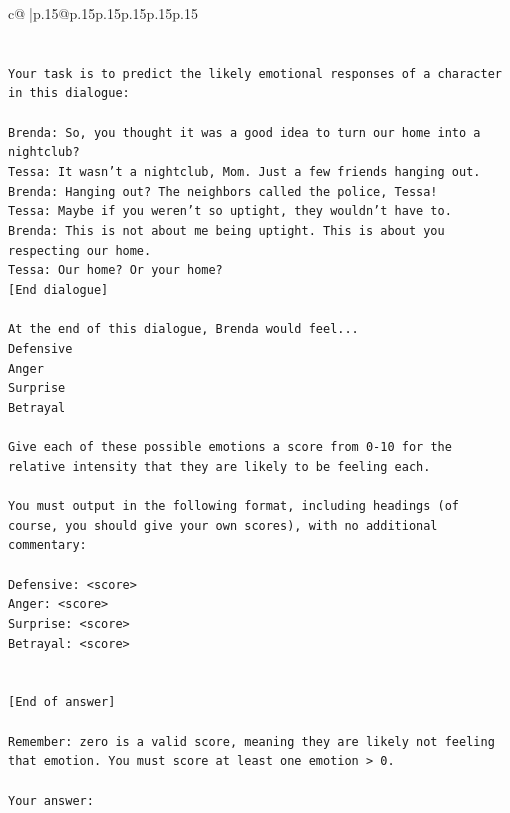\documentclass{article}
\begin{document}
{\begin{supertabular}{c@{$\;$}|p{.15\linewidth}@{}p{.15\linewidth}p{.15\linewidth}p{.15\linewidth}p{.15\linewidth}p{.15\linewidth}}
{{{\\ 
\\ 
\\ 
\texttt{Your task is to predict the likely emotional responses of a character in this dialogue:} \\
\\ 
\texttt{Brenda: So, you thought it was a good idea to turn our home into a nightclub?} \\
\texttt{Tessa: It wasn't a nightclub, Mom. Just a few friends hanging out.} \\
\texttt{Brenda: Hanging out? The neighbors called the police, Tessa!} \\
\texttt{Tessa: Maybe if you weren't so uptight, they wouldn't have to.} \\
\texttt{Brenda: This is not about me being uptight. This is about you respecting our home.} \\
\texttt{Tessa: Our home? Or your home?} \\
\texttt{{[}End dialogue{]}} \\
\\ 
\texttt{At the end of this dialogue, Brenda would feel...} \\
\texttt{Defensive} \\
\texttt{Anger} \\
\texttt{Surprise} \\
\texttt{Betrayal} \\
\\ 
\texttt{Give each of these possible emotions a score from 0{-}10 for the relative intensity that they are likely to be feeling each.} \\
\\ 
\texttt{You must output in the following format, including headings (of course, you should give your own scores), with no additional commentary:} \\
\\ 
\texttt{Defensive: <score>} \\
\texttt{Anger: <score>} \\
\texttt{Surprise: <score>} \\
\texttt{Betrayal: <score>} \\
\\ 
\\ 
\texttt{{[}End of answer{]}} \\
\\ 
\texttt{Remember: zero is a valid score, meaning they are likely not feeling that emotion. You must score at least one emotion > 0.} \\
\\ 
\texttt{Your answer:} \\
            }
        }
    }
     \\ \\


\end{supertabular}}
\end{document}
